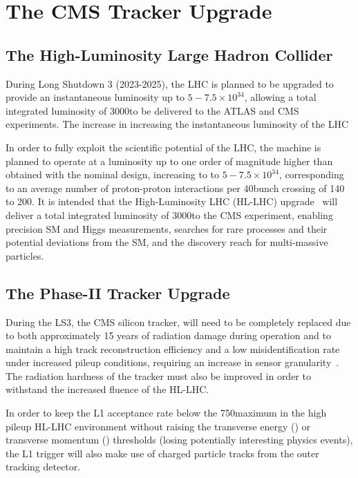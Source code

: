 \section{The CMS Tracker Upgrade}\label{sec:tk-upgrade}
 
\subsection{The High-Luminosity Large Hadron Collider} 
During Long Shutdown 3 (2023-2025), the LHC is planned to be upgraded to provide an instantaneous luminosity up to $5-7.5 \times {10}^{34}$\percms, allowing a total integrated luminosity of 3000\fbinv to be delivered to the ATLAS and CMS experiments.
The increase in increasing the instantaneous luminosity of the LHC

In order to fully exploit the scientific potential of the LHC, the machine is planned to operate at a luminosity up to one order of magnitude higher than obtained with the nominal design, increasing to to $5-7.5 \times {10}^{34}$\percms, corresponding to an average number of proton-proton interactions per 40\MHz bunch crossing of 140 to 200.
It is intended that the High-Luminosity LHC (HL-LHC) upgrade~\cite{hl-lhc-prelim-design-report} will deliver a total integrated luminosity of 3000\fbinv to the CMS experiment, enabling precision SM and Higgs measurements, searches for rare processes and their potential deviations from the SM, and the discovery reach for multi-\TeV massive particles. 

\subsection{The Phase-II Tracker Upgrade}

During the LS3, the CMS silicon tracker, will need to be completely replaced due to both approximately 15 years of radiation damage during operation and to maintain a high track reconstruction efficiency and a low misidentification rate under increased pileup conditions, requiring an increase in sensor granularity~\cite{P2TrackerTDR}.
The radiation hardness of the tracker must also be improved in order to withstand the increased fluence of the HL-LHC.

In order to keep the L1 acceptance rate below the 750\kHz maximum in the high pileup HL-LHC environment without raising the transverse energy (\ET) or transverse momentum (\pT) thresholds (losing potentially interesting physics events), the L1 trigger will also make use of charged particle tracks from the outer tracking detector.
 
